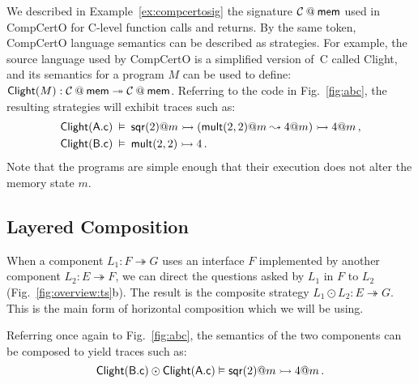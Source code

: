 \begin{example} \label{ex:compcertosem} %
We described in Example~\ref{ex:compcertosig}
the signature $\mathcal{C} \mathbin@ \kw{mem}$
used in CompCertO for C-level function calls and returns.
By the same token, CompCertO language semantics
can be described as strategies.
For example,
the source language used by CompCertO
is a simplified version of~C called Clight,
and its semantics for a program $M$ can be used to define:
$
  \kw{Clight}(M) : \mathcal{C} \mathbin@ \kw{mem}
    \twoheadrightarrow \mathcal{C} \mathbin@ \kw{mem}
$.
Referring to the code in Fig.~\ref{fig:abc},
the resulting strategies will exhibit traces such as:
\begin{align*}
   \mathsf{Clight} ( \mathsf{A.c} ) \:&\vDash\:
   \mathsf{sqr} (2)@m \rightarrowtail
  ( \mathsf{mult} (2,2)@m \leadsto 4@m) \rightarrowtail
  4@m \,,
\\
   \mathsf{Clight} ( \mathsf{B.c} ) \:&\vDash\:
   \mathsf{mult} (2,2) \rightarrowtail 4
  \,.
\end{align*}
Note that the programs are simple enough that
their execution does not alter the memory state $m$.
\end{example}


\subsection{Layered Composition} %

When a component $L_1 : F \twoheadrightarrow G$
uses an interface $F$ implemented by
another component $L_2 : E \twoheadrightarrow F$,
we can direct the questions asked by $L_1$ in $F$ to $L_2$
(Fig.~\ref{fig:overview:ts}b).
The result is the composite strategy
$L_1 \odot L_2 : E \twoheadrightarrow G$. %
This is the main form of horizontal composition which we will be using.

\begin{example} %
Referring once again to Fig.~\ref{fig:abc},
the semantics of the two components can be composed
to yield traces such as:
\[
   \mathsf{Clight} ( \mathsf{B.c} ) \odot  \mathsf{Clight} ( \mathsf{A.c} )
  \vDash
   \mathsf{sqr} (2)@m \rightarrowtail 4@m
  \,.
\]
\end{example}

